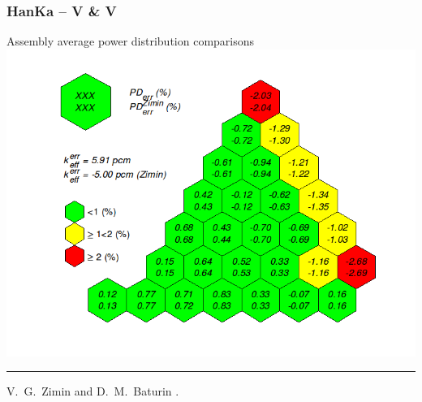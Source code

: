 \begin{frame}[t]
  \frametitle{HanKa -- V \& V}
  \vspace*{-.3cm}
  \centering\textcolor{structure.bg!95!blue}{ Assembly average power distribution comparisons }\\[-.3em]
  \includegraphics[scale=.5]{images/HanKa/HCZ1T.png}
  \vspace{-.7cm} \hrule width 5.1cm \vspace{-0.1cm}
	\begin{thebibliography}{\textwidth} 
	  \beamertemplatearticlebibitems
    {\scriptsize V.~G.~Zimin and D.~M.~Baturin}
    . 
	\end{thebibliography}
\end{frame}

